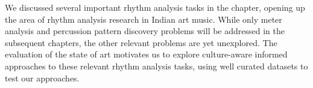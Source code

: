 We discussed several important rhythm analysis tasks in the chapter, opening up the area of rhythm analysis research in Indian art music. While only meter analysis and percussion pattern discovery problems will be addressed in the subsequent chapters, the other relevant problems are yet unexplored. The evaluation of the state of art motivates us to explore culture-aware informed approaches to these relevant rhythm analysis tasks, using well curated datasets to test our approaches. 
% 
% 
